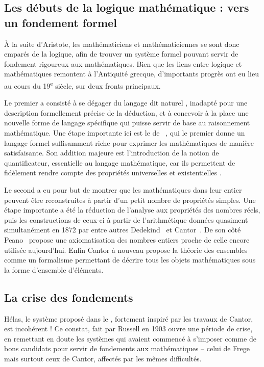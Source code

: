 \subsection{Les débuts de la logique mathématique : vers un fondement formel}

À la suite d’Aristote, les mathématiciens et mathématiciennes se sont donc emparés
de la logique, afin de trouver un système formel
pouvant servir de fondement rigoureux aux mathématiques.
Bien que les liens entre logique et mathématiques remontent à l’Antiquité grecque,
d’importants progrès ont eu lieu au cours
du 19\textsuperscript{e} siècle, sur deux fronts principaux.

Le premier a consisté à se dégager du langage dit
naturel%
, inadapté pour une description formellement précise de la déduction, et à
concevoir à la place une nouvelle forme de langage spécifique qui puisse servir de
base au raisonnement mathématique.
Une étape importante ici est le  de
\citeauthor{Begriffsschrift}~,
qui le premier donne un langage formel suffisamment riche pour exprimer les mathématiques
de manière satisfaisante. Son addition majeure est l’introduction
de la notion de quantificateur, essentielle au langage mathématique,
car ils permettent de fidèlement rendre compte des propriétés universelles%
et existentielles%
.

Le second a eu pour but de montrer que les mathématiques dans leur entier peuvent
être reconstruites à partir d’un petit nombre de propriétés simples. Une étape
importante a été la réduction de l’analyse aux propriétés
des nombres réels, puis les constructions de ceux-ci à partir
de l’arithmétique données quasiment simultanément en 1872 par entre autres
Dedekind~ et Cantor~.
De son côté Peano~ propose
une axiomatisation des nombres entiers proche de celle encore utilisée aujourd’hui.
Enfin Cantor à nouveau propose la théorie des ensembles~
comme un formalisme permettant de décrire tous
les objets mathématiques sous la forme d’ensemble d’éléments.

\subsection{La crise des fondements}
Hélas, le système proposé dans le , fortement inspiré par
les travaux de Cantor, est incohérent !%
Ce constat, fait par Russell en 1903%
ouvre une période de crise, en remettant en doute les systèmes qui avaient commencé à
s’imposer comme de bons candidats pour servir de fondements aux mathématiques –
celui de Frege mais surtout ceux de Cantor, affectés par les mêmes difficultés.

